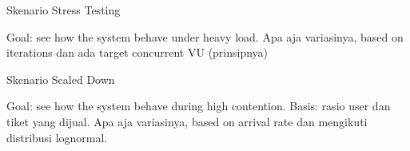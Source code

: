 Skenario Stress Testing

Goal: see how the system behave under heavy load.
Apa aja variasinya, based on iterations dan ada target concurrent VU (prinsipnya)

Skenario Scaled Down

Goal: see how the system behave during high contention.
Basis: rasio user dan tiket yang dijual.
Apa aja variasinya, based on arrival rate dan mengikuti distribusi lognormal.
